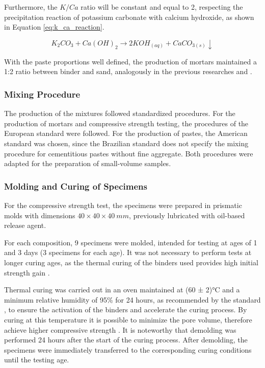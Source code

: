 Furthermore, the $K/Ca$ ratio will be constant and equal to 2, respecting the precipitation reaction of potassium carbonate with calcium hydroxide, as shown in Equation \ref{eq:k_ca_reaction}.

\begin{equation}
    \label{eq:k_ca_reaction}
    K_2CO_3 + Ca(OH)_2 \rightarrow  2KOH_{(aq)} + CaCO_{3(s)} \downarrow
\end{equation}

With the paste proportions well defined, the production of mortars maintained a 1:2 ratio between binder and sand, analogously in the previous researches \cite{batista2025mgosio2} and \cite{arellano2014geopolymer}. 

\subsubsection{Mixing Procedure}
\label{sec:mixing_procedure}

The production of the mixtures followed standardized procedures. For the production of mortars and compressive strength testing, the procedures of the European standard \cite{EN1961_2016} were followed. For the production of pastes, the American standard \cite{ASTM_C305_2006} was chosen, since the Brazilian standard does not specify the mixing procedure for cementitious pastes without fine aggregate. Both procedures were adapted for the preparation of small-volume samples.

\subsubsection{Molding and Curing of Specimens}
\label{sec:molding_and_curing_specimens}

For the compressive strength test, the specimens were prepared in prismatic molds with dimensions $40 \times 40 \times 40 \ mm$, previously lubricated with oil-based release agent.

For each composition, 9 specimens were molded, intended for testing at ages of 1 and 3 days (3 specimens for each age). It was not necessary to perform tests at longer curing ages, as the thermal curing of the binders used provides high initial strength gain \cite{aredes2015effect}.

Thermal curing was carried out in an oven maintained at (60 ± 2)°C and a minimum relative humidity of 95\% for 24 hours, as recommended by the standard \cite{ABNT_NBR_9479_2006}, to ensure the activation of the binders and accelerate the curing process.
By curing at this temperature it is possible to minimize the pore volume, therefore achieve higher compressive strength \cite{aredes2015effect}.
It is noteworthy that demolding was performed 24 hours after the start of the curing process. After demolding, the specimens were immediately transferred to the corresponding curing conditions until the testing age.

